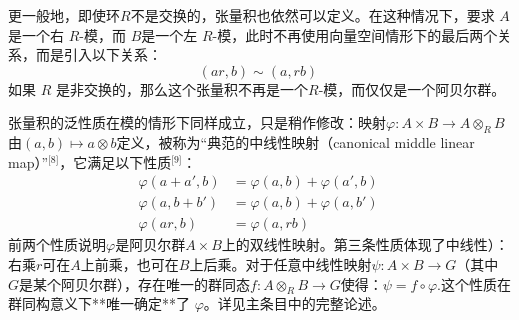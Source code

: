 更一般地，即使环\( R \)不是交换的，张量积也依然可以定义。在这种情况下，要求 \( A \)是一个右 \( R \)-模，而 \( B \)是一个左 \( R \)-模，此时不再使用向量空间情形下的最后两个关系，而是引入以下关系：
\[
(ar, b) \sim (a, rb)~
\]
如果 \( R \) 是非交换的，那么这个张量积不再是一个\( R \)-模，而仅仅是一个阿贝尔群。

张量积的泛性质在模的情形下同样成立，只是稍作修改：映射\(\varphi : A \times B \to A \otimes_R B\)由\((a, b) \mapsto a \otimes b\)定义，被称为“典范的中线性映射（canonical middle linear map）”\(^\text{[8]}\)，它满足以下性质\(^\text{[9]}\)：
\[
\begin{aligned}
\varphi(a + a', b) &= \varphi(a, b) + \varphi(a', b) \\
\varphi(a, b + b') &= \varphi(a, b) + \varphi(a, b') \\
\varphi(ar, b) &= \varphi(a, rb)
\end{aligned}~
\]
前两个性质说明\( \varphi \)是阿贝尔群\( A \times B \)上的双线性映射。第三条性质体现了中线性）：右乘\( r \)可在\( A \)上前乘，也可在\( B \)上后乘。对于任意中线性映射\( \psi : A \times B \to G \)（其中 \( G \)是某个阿贝尔群），存在唯一的群同态\( f : A \otimes_R B \to G \)使得：\(\psi = f \circ \varphi\).这个性质在群同构意义下**唯一确定**了 \( \varphi \)。详见主条目中的完整论述。

